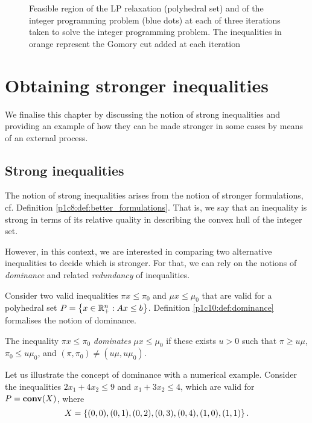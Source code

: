 \begin{figure}[h]
      \caption{Feasible region of the LP relaxation (polyhedral set) and of the integer programming problem (blue dots) at each of three iterations taken to solve the integer programming problem. The inequalities in orange represent the Gomory cut added at each iteration} \label{p1c10:fig:LP_1}	
\end{figure}


\section{Obtaining stronger inequalities}

We finalise this chapter by discussing the notion of strong inequalities and providing an example of how they can be made stronger in some cases by means of an external process. 


\subsection{Strong inequalities}

The notion of strong inequalities arises from the notion of stronger formulations, cf. Definition \ref{p1c8:def:better_formulations}. That is, we say that an inequality is strong in terms of its relative quality in describing the convex hull of the integer set.

However, in this context, we are interested in comparing two alternative inequalities to decide which is stronger. For that, we can rely on the notions of \emph{dominance} and related \emph{redundancy} of inequalities. 

Consider two valid inequalities $\pi x \leq \pi_0$ and $\mu x \leq \mu_0$ that are valid for a polyhedral set $P = \left\{ x \in \mathbb{R}^n_+ : Ax \leq b \right \}$. Definition \ref{p1c10:def:dominance} formalises the notion of dominance.

\begin{definition}[Dominance] \label{p1c10:def:dominance}
    The inequality $\pi x \leq \pi_0$ \emph{dominates} $\mu x \leq \mu_0$ if these exists $u > 0$ such that $\pi \geq u\mu$, $\pi_0 \leq u\mu_0$, and $(\pi, \pi_0) \neq (u\mu, u\mu_0)$.
\end{definition}

Let us illustrate the concept of dominance with a numerical example. Consider the inequalities $2x_1 + 4x_2 \leq 9$ and $x_1 + 3x_2 \leq 4$, which are valid for $P = \mathop{\bf conv}(X)$, where 
	\begin{equation*}
	X = \left\{ (0,0), (0,1), (0,2), (0,3), (0,4), (1,0), (1,1) \right \}.	
	\end{equation*}
	
